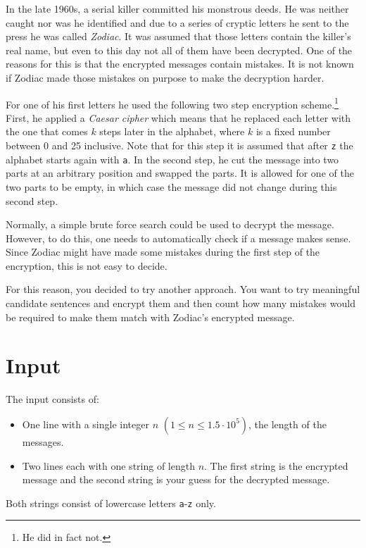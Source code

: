 %
In the late 1960s, a serial killer committed his monstrous deeds.
He was neither caught nor was he identified and due to a series of cryptic letters he sent to the press he was called \emph{Zodiac}.
It was assumed that those letters contain the killer's real name, but even to this day not all of them have been decrypted.
One of the reasons for this is that the encrypted messages contain mistakes.
It is not known if Zodiac made those mistakes on purpose to make the decryption harder.

For one of his first letters he used the following two step encryption scheme.\footnote{He did in fact not.}
First, he applied a \emph{Caesar cipher} which means that he replaced each letter with the one that comes $k$ steps later in the alphabet, where $k$ is a fixed number between 0 and 25 inclusive.
Note that for this step it is assumed that after \texttt{z} the alphabet starts again with \texttt{a}.
In the second step, he cut the message into two parts at an arbitrary position and swapped the parts.
It is allowed for one of the two parts to be empty, in which case the message did not change during this second step.

Normally, a simple brute force search could be used to decrypt the message.
However, to do this, one needs to automatically check if a message makes sense.
Since Zodiac might have made some mistakes during the first step of the encryption, this is not easy to decide.

For this reason, you decided to try another approach.
You want to try meaningful candidate sentences and encrypt them and then count how many mistakes would be required to make them match with Zodiac's encrypted message.

\section*{Input}
The input consists of:
\begin{itemize}
	\item One line with a single integer $n$ $(1\leq n \leq 1.5\cdot10^5)$, the length of the messages.
	\item Two lines each with one string of length $n$.
	The first string is the encrypted message and the second string is your guess for the decrypted message.
\end{itemize}
Both strings consist of lowercase letters \texttt{a}-\texttt{z} only.

